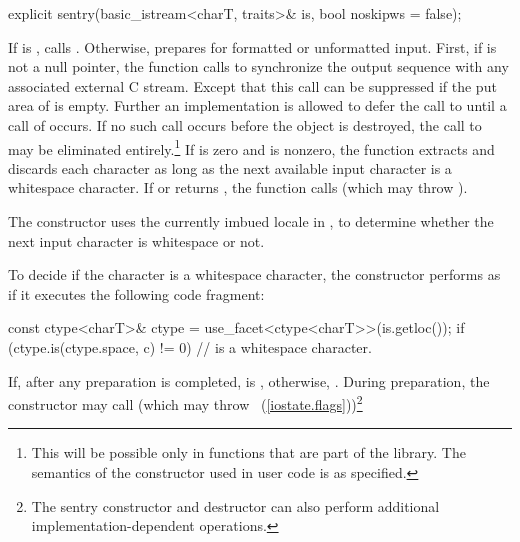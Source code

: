 %
%
\begin{itemdecl}
explicit sentry(basic_istream<charT, traits>& is, bool noskipws = false);
\end{itemdecl}

\begin{itemdescr}
\pnum
\effects
If
is
,
calls . Otherwise,
prepares for formatted or
unformatted input.
First, if
is not a null pointer, the
function calls
%
to synchronize the output sequence with any associated external
C stream.
Except that this call can be suppressed if the put area of
is empty.
Further an implementation is allowed to defer the call to
until a
call of
occurs.
If no such call occurs before the
object is destroyed, the call to
may be eliminated entirely.\footnote{This will be possible only in functions
that are part of the library.
The semantics of the constructor used in user code is as specified.}
If  is zero and
is nonzero, the function extracts and discards each character as long as
the next available input character  is a whitespace character.
If
or
returns
,
the function calls
(which may throw
).

\pnum
\remarks
The constructor
uses the currently imbued locale in ,
to determine whether the next input character is
whitespace or not.

\pnum
To decide if the character  is a whitespace character,
the constructor performs as if it executes the following code fragment:
\begin{codeblock}
const ctype<charT>& ctype = use_facet<ctype<charT>>(is.getloc());
if (ctype.is(ctype.space, c) != 0)
  //  is a whitespace character.
\end{codeblock}

\pnum
If, after any preparation is completed,
is
,
otherwise,
.
During preparation, the constructor may call
(which may throw
~(\ref{iostate.flags}))\footnote{The sentry
constructor and destructor
can also perform additional
%
implementation-dependent operations.}
\end{itemdescr}

